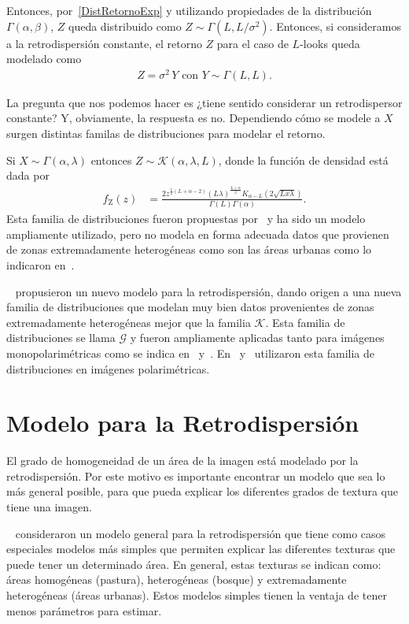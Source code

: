 Entonces, por~\eqref{DistRetornoExp} y utilizando propiedades de la distribución $\Gamma(\alpha,\beta)$, $Z$  queda distribuido como $Z \sim \Gamma(L,L/\sigma^2)$. Entonces, si consideramos a la retrodispersión constante, el retorno $Z$ para el caso de $L$-looks queda modelado como
\begin{align}
Z=\sigma^2 \, Y \text{ con } Y \sim \Gamma(L,L).
\end{align}

La pregunta que nos podemos hacer es ¿tiene sentido considerar un retrodispersor constante? Y, obviamente, la respuesta es no. Dependiendo cómo se modele a $X$ surgen distintas familas de distribuciones para modelar el retorno.

Si $X \sim \Gamma(\alpha,\lambda)$ entonces $Z \sim \mathcal{K}(\alpha,\lambda,L)$, donde la función de densidad está dada por
\begin{align}
f_{\text{Z}}(z)&=\frac{2 z^{\frac{1}{2} (L+\alpha-2 )} (L \lambda )^{\frac{L+\alpha }{2}} K_{\alpha -L}\left(2 \sqrt{L x
		\lambda }\right)}{\Gamma (L) \Gamma (\alpha )}.
\end{align}
 Esta familia de distribuciones fueron propuestas por~\citet{Jakeman87} y ha sido un modelo ampliamente utilizado, pero no modela en forma adecuada datos que provienen de zonas extremadamente heterogéneas como son las áreas urbanas como lo indicaron en~\citet{Frery97}.

~\citet{Frery99} propusieron un nuevo modelo para la retrodispersión, dando origen a una nueva familia de distribuciones que modelan muy bien datos provenientes de zonas extremadamente heterogéneas mejor que la familia $\mathcal{K}$. Esta familia de distribuciones se llama $\mathcal{G}$ y fueron ampliamente aplicadas tanto para imágenes monopolarimétricas como se indica en~\citet{gambini2015} y~\citet{Nascimento2009}. En~\citet{Freitas2005} y~\citet{Palacio2019} utilizaron esta familia de distribuciones en imágenes polarimétricas.

\section{Modelo para la Retrodispersión}
\label{ModeloBackscatter}

El grado de homogeneidad de un área de la imagen está modelado por la retrodispersión. Por este motivo es importante encontrar un modelo que sea lo más general posible, para que pueda explicar los diferentes grados de textura que tiene una imagen.

~\citet{Frery99} consideraron un modelo general para la retrodispersión que tiene como casos especiales modelos más simples que permiten explicar las diferentes texturas que puede tener un determinado área. En general, estas texturas se indican como: áreas homogéneas (pastura), heterogéneas (bosque) y extremadamente heterogéneas (áreas urbanas). Estos modelos simples tienen la ventaja de tener menos parámetros para estimar.


